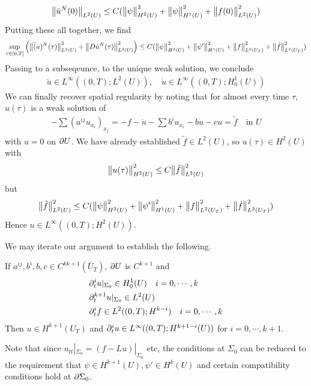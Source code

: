 \documentclass[12pt,a4paper]{report}
\newenvironment{proof}
{\begin{changemargin}{1cm}{0.5cm} 
	}%
	{\end{changemargin}
}
\begin{document}
\begin{proof}
\begin{align*}
\bigl\lVert\ddot{u}^N(0)\bigr\rVert_{L^2(U)}\leq C(\bigl\lVert\psi\bigr\rVert_{H^2(U)}^2 + \bigl\lVert\psi\bigr\rVert_{H^1(U)}^2 + \bigl\lVert f(0)\bigr\rVert_{L^2(U)}^2)
\end{align*}
Putting these all together, we find
\begin{align*}
\sup_{\tau \in [0,T]} \Big( \bigl\lVert\ddot(u)^N(\tau)\bigr\rVert_{L^2(U)}^2 + \bigl\lVert D\dot{u}^N (\tau)\bigr\rVert_{L^2(U)}^2 \Big) \leq C (\bigl\lVert\psi\bigr\rVert_{H^2(U)}^2 + \bigl\lVert\psi'\bigr\rVert_{H^1(U)}^2 + \bigl\lVert f\bigr\rVert_{L^2(U_T)}^2 + \bigl\lVert\dot{f}\bigr\rVert_{L^2(U_T)}^2)
\end{align*}
Passing to a subseqeunce, to the unique weak solution, we conclude
\begin{align*}
\ddot{u}\in L^{\infty}((0,T);L^2(U)), \quad \dot{u}\in L^{\infty} ((0, T); H_0^1(U))
\end{align*}
We can finally recover spatial regularity by noting that for almost every time $\tau$, $u(\tau)$ is a weak solution of
\begin{align*}
-\sum (a^{ij} u_{x_i})_{x_j} = -f - \ddot{u} - \sum b^i u_{x_i} - b\dot{u} - cu = \tilde{f} \quad \text{in } U
\end{align*}
with $u=0$ on $\partial U$. We have already established $\tilde{f}\in L^2(U)$, so $u(\tau)\in H^2(U)$ with
\begin{align*}
\bigl\lVert u(\tau)\bigr\rVert_{H^2(U)}^2 \leq C \bigl\lVert\tilde{f}\bigr\rVert_{L^2(U)}^2
\end{align*}
but
\begin{align*}
\bigl\lVert\tilde{f}\bigr\rVert_{L^2(U)}^2 \leq C(\bigl\lVert\psi\bigr\rVert_{H^2(U)}^2 + \bigl\lVert\psi'\bigr\rVert_{H^1(U)}^2 + \bigl\lVert f\bigr\rVert_{L^2(U_T)}^2 + \bigl\lVert\dot{f}\bigr\rVert_{L^2(U_T)}^2)
\end{align*}
Hence $u\in L^{\infty}((0, T); H^2(U))$.

\eop
\end{proof}
\s

We may iterate our argument to establish the following.
\s

\thm If $a^{ij}, b^i, b, c\in C^{kk+1}(\bar{U}_T)$, $\partial U$ is $C^{k+1}$ and
\begin{align*}
&\partial_t^i u|_{\Sigma_0}\in H_0^1 (U)\quad i=0, \cdots, k\\
&\partial_t^{k+1} u|_{\Sigma_0} \in L^2(U)\\
& \partial_t^i f \in L^2((0, T); H^{k-i}) \quad i=0, \cdots, k
\end{align*}
Then $u\in H^{k+1}(U_T)$ and $\partial_t^i u \in L^{\infty}((0, T); H^{k+1 -i}(U))$ for $i=0, \cdots, k+1$.

\quad Note that since $u_{tt}|_{\Sigma_0} = (f- Lu)|_{\Sigma_0}$ etc, the conditions at $\Sigma_0$ can be reduced to the requirement that $\psi \in H^{k+1}(U), \psi'\in H^k(U)$ and certain compatibility conditions hold at $\partial \Sigma_0$.
\s
\end{document}

